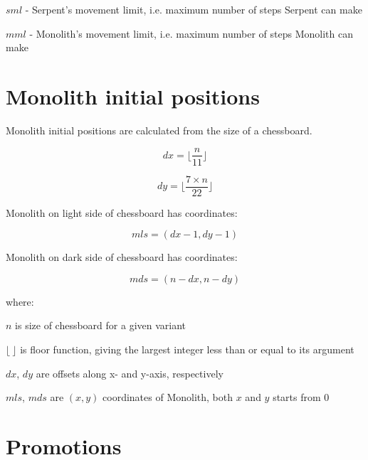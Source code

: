 $sml$ - Serpent's movement limit, i.e. maximum number of steps Serpent can make

$mml$ - Monolith's movement limit, i.e. maximum number of steps Monolith can make

\clearpage %

\section*{Monolith initial positions}
\label{sec:Definitions/Monolith initial positions}

Monolith initial positions are calculated from the size of a chessboard.

\begin{equation}
dx = \lfloor \frac{n}{11} \rfloor
\end{equation}

\begin{equation}
dy = \lfloor \frac{7 \times n}{22} \rfloor
\end{equation}

Monolith on light side of chessboard has coordinates:

\begin{equation}
mls = (dx - 1, dy - 1)
\end{equation}

Monolith on dark side of chessboard has coordinates:

\begin{equation}
mds = (n - dx, n - dy)
\end{equation}

where:

$n$ is size of chessboard for a given variant

$\lfloor\ \rfloor$ is floor function, giving the largest integer less than or equal to its argument

$dx$, $dy$ are offsets along x- and y-axis, respectively

$mls$, $mds$ are $(x, y)$ coordinates of Monolith, both $x$ and $y$ starts from $0$

\clearpage %

\section*{Promotions}
\label{sec:Definitions/Promotions}

